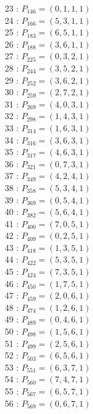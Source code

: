 \documentclass{article}
\begin{document}
{\begin{multicols}{3}
23 : $P_{146}=( 0, 1, 1, 1 )$\\
24 : $P_{166}=( 5, 3, 1, 1 )$\\
25 : $P_{183}=( 6, 5, 1, 1 )$\\
26 : $P_{188}=( 3, 6, 1, 1 )$\\
27 : $P_{225}=( 0, 3, 2, 1 )$\\
28 : $P_{244}=( 3, 5, 2, 1 )$\\
29 : $P_{252}=( 3, 6, 2, 1 )$\\
30 : $P_{259}=( 2, 7, 2, 1 )$\\
31 : $P_{269}=( 4, 0, 3, 1 )$\\
32 : $P_{298}=( 1, 4, 3, 1 )$\\
33 : $P_{314}=( 1, 6, 3, 1 )$\\
34 : $P_{316}=( 3, 6, 3, 1 )$\\
35 : $P_{317}=( 4, 6, 3, 1 )$\\
36 : $P_{321}=( 0, 7, 3, 1 )$\\
37 : $P_{349}=( 4, 2, 4, 1 )$\\
38 : $P_{358}=( 5, 3, 4, 1 )$\\
39 : $P_{369}=( 0, 5, 4, 1 )$\\
40 : $P_{382}=( 5, 6, 4, 1 )$\\
41 : $P_{400}=( 7, 0, 5, 1 )$\\
42 : $P_{409}=( 0, 2, 5, 1 )$\\
43 : $P_{418}=( 1, 3, 5, 1 )$\\
44 : $P_{422}=( 5, 3, 5, 1 )$\\
45 : $P_{424}=( 7, 3, 5, 1 )$\\
46 : $P_{450}=( 1, 7, 5, 1 )$\\
47 : $P_{459}=( 2, 0, 6, 1 )$\\
48 : $P_{474}=( 1, 2, 6, 1 )$\\
49 : $P_{489}=( 0, 4, 6, 1 )$\\
50 : $P_{498}=( 1, 5, 6, 1 )$\\
51 : $P_{499}=( 2, 5, 6, 1 )$\\
52 : $P_{503}=( 6, 5, 6, 1 )$\\
53 : $P_{551}=( 6, 3, 7, 1 )$\\
54 : $P_{560}=( 7, 4, 7, 1 )$\\
55 : $P_{567}=( 6, 5, 7, 1 )$\\
56 : $P_{569}=( 0, 6, 7, 1 )$\\
\end{multicols}


%


%


}%
\end{document}
